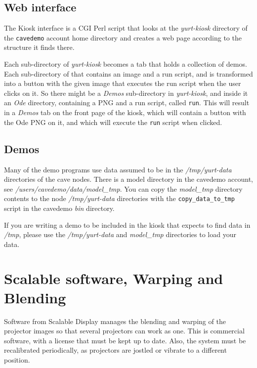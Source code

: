 \documentclass[11pt]{article}
\newcommand{\cmd}[1]{\texttt{#1}\xspace}
\newcommand{\dir}[1]{\textit{#1}\xspace}
\begin{document}
\subsection{Web interface}

The Kiosk interface is a CGI Perl script that looks at the
\dir{yurt-kiosk} directory of the \cmd{cavedemo} account home
directory and creates a web page according to the structure it finds
there.

Each sub-directory of \dir{yurt-kiosk} becomes a tab that holds a
collection of demos.  Each sub-directory of that contains an image and
a run script, and is transformed into a button with the given image
that executes the run script when the user clicks on it.  So there
might be a \dir{Demos} sub-directory in \dir{yurt-kiosk}, and inside
it an \dir{Ode} directory, containing a PNG and a run script, called
\cmd{run}.  This will result in a \dir{Demos} tab on the front page of
the kiosk, which will contain a button with the Ode PNG on it, and
which will execute the \cmd{run} script when clicked.



\subsection{Demos}
\label{Demos}

Many of the demo programs use data assumed to be in the
\dir{/tmp/yurt-data} directories of the cave nodes.  There is a model
directory in the cavedemo account, see
\dir{/users/cavedemo/data/model\_tmp}.  You can copy the
\dir{model\_tmp} directory contents to the node \dir{/tmp/yurt-data}
directories with the \cmd{copy\_data\_to\_tmp} script in the cavedemo
\dir{bin} directory.

If you are writing a demo to be included in the kiosk that expects to
find data in \dir{/tmp}, please use the  \dir{/tmp/yurt-data} and
\dir{model\_tmp} directories to load your data.


\section{Scalable software, Warping and Blending}

Software from Scalable Display manages the blending and warping of the
projector images so that several projectors can work as one.  This is
commercial software, with a license that must be kept up to date.
Also, the system must be recalibrated periodically, as projectors are
jostled or vibrate to a different position.
\end{document}
